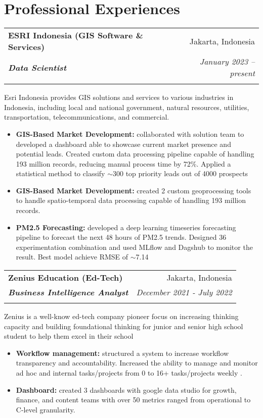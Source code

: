 \documentclass[a4paper, 11pt]{article}
\makeatletter
\newcommand{\resumeItem}[2]{
    \item\small{
        \textbf{#1}{#2 \vspace{-2pt}}
    }
}
\newcommand{\resumeSubheading}[4]{
    \vspace{-1pt}
    \begin{tabular*}{0.97\textwidth}{l@{\extracolsep{\fill}}r}
        \color{lightblue}\textbf{#1} & #2 \\
        \textbf{\textit{\small#3}} & \textit{\small #4} \\
        \textnormal{}\vspace{-5pt}
    \end{tabular*}\vspace{-5pt}
}
\newcommand{\resumeSubHeadingListStart}{\begin{itemize}[leftmargin=*]}
\newcommand{\resumeItemListStart}{\begin{itemize}[leftmargin=*]\setlength\itemsep{0em}\vspace{-1pt}}
\newcommand{\resumeItemListEnd}{\end{itemize}\vspace{-5pt}}
\makeatother
\begin{document}
    \vspace{-20pt}
    \section{Professional Experiences}
    \resumeSubheading
    {ESRI Indonesia (GIS Software \& Services)}{Jakarta, Indonesia}
    {Data Scientist}{January 2023 – present}
    {Esri Indonesia provides GIS solutions and services to various industries in 
    Indonesia, including local and national government, natural resources, utilities, 
    transportation, telecommunications, and commercial.}
    \vspace{-5pt}
    \resumeItemListStart
    \resumeItem{GIS-Based Market Development:}{ collaborated with solution team to 
    developed a dashboard able to showcase current market presence and potential leads. 
    Created custom data processing pipeline capable of handling 193 million records, 
    reducing manual process time by 72\%. Applied a statistical method to classify 
    $\sim$300 top priority leads out of 4000 prospects
    }
    \resumeItem{GIS-Based Market Development:}{ created 2 custom geoprocessing tools to 
    handle spatio-temporal data processing capable of handling 193 million records.
    }
    \resumeItem{PM2.5 Forecasting:}{ developed a deep learning 
    timeseries forecasting pipeline to forecast the next 48 hours of PM2.5 trends. 
    Designed 36 experimentation combination and used MLflow and Dagshub to monitor the 
    result. Best model achieve RMSE of $\sim$7.14
    }
    \resumeItemListEnd

    \vspace{5pt}
    \resumeSubheading
    {Zenius Education (Ed-Tech)}
    {Jakarta, Indonesia}
    {Business Intelligence Analyst}
    {December 2021 - July 2022}
    {Zenius is a well-know ed-tech company pioneer focus on increasing thinking 
    capacity and building foundational thinking for junior and senior high school 
    student to help them excel in their school}
    \vspace{-5pt}
    \resumeItemListStart
    \resumeItem{Workflow management:}{ structured a system to increase 
    workflow transparency and accountability. Increased the ability to manage 
    and monitor ad hoc and internal tasks/projects from 0 to 
    16+ tasks/projects weekly}.
    \resumeItem{Dashboard:}{ created 3 dashboards with google data studio for growth,
    finance, and content teams with over 50 metrics ranged from operational to C-level
    granularity.}
    \resumeItemListEnd
\end{document}
